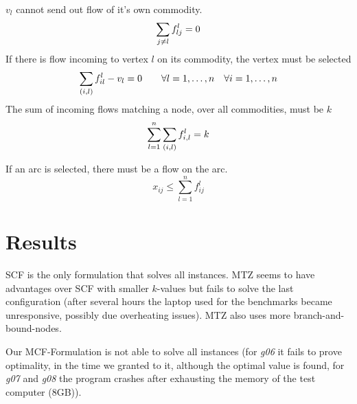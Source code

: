\documentclass[a4paper]{article}
\numberwithin{equation}{section}
\begin{document}
$v_l$ cannot send out flow of it's own commodity.
\begin{equation}
\sum_{j\not=l} f_{lj}^l =0\\
\end{equation}
If there is flow incoming to vertex $l$ on its commodity, the vertex must be selected
\begin{equation}
\sum_{(i,l)} f_{il}^l - v_l=0 \qquad \forall l = 1,\dots,n \quad \forall i = 1,\dots,n\\
\end{equation}
The sum of incoming flows matching a node, over all commodities, must be $k$
\begin{equation}
	\sum_{l=1}^n \sum_{(i,l)} f_{i,l}^l = k\\
\end{equation}

If an arc is selected, there must be a flow on the arc.
\begin{equation}
x_{ij} \leq \sum_{l=1}^n f_{ij}^l
\end{equation}

\section{Results}

SCF is the only formulation that solves all instances. MTZ seems to have advantages over SCF with
smaller $k$-values but fails to solve the last configuration (after several hours the laptop
used for the benchmarks became unresponsive, possibly due overheating issues). MTZ also uses more
branch-and-bound-nodes.

Our MCF-Formulation is not able to solve all instances (for \emph{g06} it fails to prove optimality,
in the time we granted to it, although the optimal value is found, for \emph{g07} and \emph{g08} the
program crashes after exhausting the memory of the test computer (8GB)).


\end{document}
